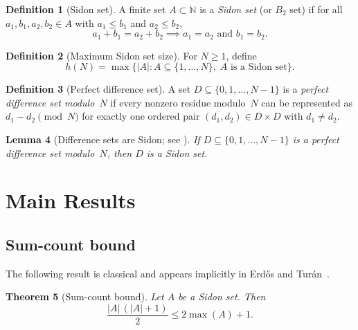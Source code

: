 \documentclass[11pt]{amsart}
\theoremstyle{plain}
\newtheorem{theorem}{Theorem}[section]
\newtheorem{lemma}[theorem]{Lemma}
\theoremstyle{definition}
\newtheorem{definition}[theorem]{Definition}
\theoremstyle{remark}
\begin{document}
\begin{definition}[Sidon set]\label{def:sidon}
A finite set $A \subset \mathbb{N}$ is a \emph{Sidon set} (or $B_2$
set) if for all $a_1, b_1, a_2, b_2 \in A$ with $a_1 \le b_1$ and
$a_2 \le b_2$,
\[
  a_1 + b_1 = a_2 + b_2 \implies a_1 = a_2 \text{ and } b_1 = b_2.
\]
\end{definition}

\begin{definition}[Maximum Sidon set size]\label{def:hN}
For $N \ge 1$, define
\[
  h(N) = \max\{|A| : A \subseteq \{1,\dots,N\},\;
    A \text{ is a Sidon set}\}.
\]
\end{definition}

\begin{definition}[Perfect difference set]\label{def:diff_set}
A set $D \subseteq \{0,1,\dots,N-1\}$ is a \emph{perfect difference set
modulo~$N$} if every nonzero residue modulo~$N$ can be represented as
$d_1 - d_2 \pmod{N}$ for exactly one ordered pair
$(d_1, d_2) \in D \times D$ with $d_1 \ne d_2$.
\end{definition}

\begin{lemma}[Difference sets are Sidon; see {\cite[Section~2]{okeefe_1999}}]\label{lem:diff_sidon}
If $D \subseteq \{0,1,\dots,N-1\}$ is a perfect difference set
modulo~$N$, then $D$ is a Sidon set.
\end{lemma}

\section{Main Results}\label{sec:main}

\subsection{Sum-count bound}

The following result is classical and appears implicitly in
Erd\H{o}s and Tur\'an~\cite{erdos_turan_1941}.

\begin{theorem}[Sum-count bound]\label{thm:sumcount}
Let $A$ be a Sidon set.  Then
\[
  \frac{|A|\,(|A|+1)}{2} \le 2\max(A) + 1.
\]
\end{theorem}
\end{document}
